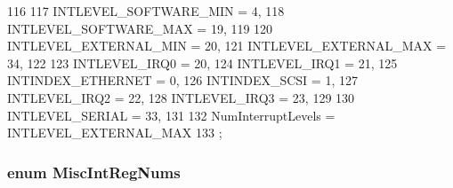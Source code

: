 \begin{DoxyCode}
116 {
117     INTLEVEL_SOFTWARE_MIN = 4,
118     INTLEVEL_SOFTWARE_MAX = 19,
119 
120     INTLEVEL_EXTERNAL_MIN = 20,
121     INTLEVEL_EXTERNAL_MAX = 34,
122 
123     INTLEVEL_IRQ0 = 20,
124     INTLEVEL_IRQ1 = 21,
125     INTINDEX_ETHERNET = 0,
126     INTINDEX_SCSI = 1,
127     INTLEVEL_IRQ2 = 22,
128     INTLEVEL_IRQ3 = 23,
129 
130     INTLEVEL_SERIAL = 33,
131 
132     NumInterruptLevels = INTLEVEL_EXTERNAL_MAX
133 };
\end{DoxyCode}
\hypertarget{namespaceMipsISA_a9969c99e14b7b491ae9e3751404cc6a1}{
\subsubsection[{MiscIntRegNums}]{\setlength{\rightskip}{0pt plus 5cm}enum {\bf MiscIntRegNums}}}
\label{namespaceMipsISA_a9969c99e14b7b491ae9e3751404cc6a1}
